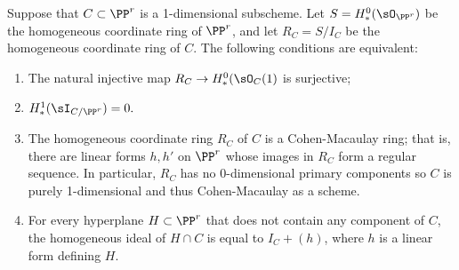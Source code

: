 \begin{proposition}\label{ACM basics}
Suppose that $C\subset \PP^r$ is a 1-dimensional subscheme. Let $S = H^0_*(\sO_{\PP^r})$
be the homogeneous coordinate ring of $\PP^r$, and let $R_C = S/I_C$ be the homogeneous
coordinate ring of $C$. The following conditions are equivalent:
\begin{enumerate}

 \item The natural injective map $R_C \to H^0_*(\sO_{C}(1)$ is surjective;
 
\item $H^1_*(\sI_{C/\PP^r}) = 0.$

\item The homogeneous coordinate ring $R_C$ of $C$ is a Cohen-Macaulay ring; that is, there are linear forms $h,h'$ on $\PP^r$ whose images in  $R_C$ form a regular sequence. In particular, $R_C$ has no 0-dimensional primary components
so $C$ is purely 1-dimensional and thus Cohen-Macaulay as a scheme.

 \item For every hyperplane $H\subset \PP^r$ that does not contain any component of $C$,
 the homogeneous ideal of $H\cap C$
 is equal to  $I_C+(h)$, where $h$ is a linear form defining $H$.
 
\end{enumerate}
\end{proposition}
 
